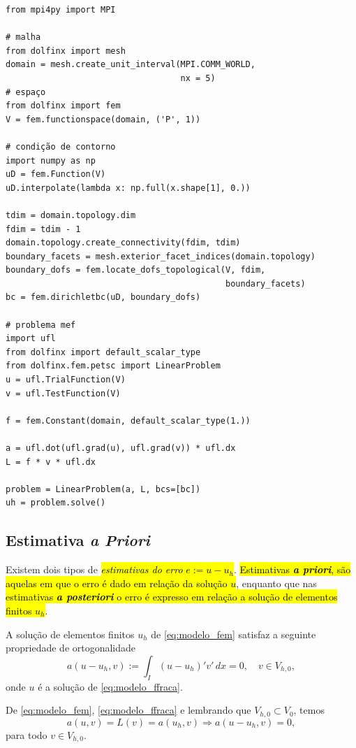 \begin{ex}
\begin{lstlisting}[caption=ex\_mef1d\_modelo.py]
from mpi4py import MPI

# malha
from dolfinx import mesh
domain = mesh.create_unit_interval(MPI.COMM_WORLD,
                                   nx = 5)
# espaço
from dolfinx import fem
V = fem.functionspace(domain, ('P', 1))

# condição de contorno
import numpy as np
uD = fem.Function(V)
uD.interpolate(lambda x: np.full(x.shape[1], 0.))

tdim = domain.topology.dim
fdim = tdim - 1
domain.topology.create_connectivity(fdim, tdim)
boundary_facets = mesh.exterior_facet_indices(domain.topology)
boundary_dofs = fem.locate_dofs_topological(V, fdim,
                                            boundary_facets)
bc = fem.dirichletbc(uD, boundary_dofs)

# problema mef
import ufl
from dolfinx import default_scalar_type
from dolfinx.fem.petsc import LinearProblem
u = ufl.TrialFunction(V)
v = ufl.TestFunction(V)

f = fem.Constant(domain, default_scalar_type(1.))

a = ufl.dot(ufl.grad(u), ufl.grad(v)) * ufl.dx
L = f * v * ufl.dx

problem = LinearProblem(a, L, bcs=[bc])
uh = problem.solve()
\end{lstlisting}
\end{ex}

\subsection{Estimativa \textit{a Priori}}
\badgeRevisar

Existem dois tipos de \hl{\emph{estimativas do erro} $e := u - u_h$}. \hl{Estimativas \textbf{\textit{a priori}}, são aquelas em que o erro é dado em relação da solução $u$}, enquanto que nas \hl{estimativas \textbf{\textit{a posteriori}} o erro é expresso em relação a solução de elementos finitos $u_h$}.

\begin{teo}\label{teo:ortogonalidade_de_Galerkin}
  A solução de elementos finitos $u_h$ de \eqref{eq:modelo_fem} satisfaz a seguinte propriedade de ortogonalidade
  \begin{equation}
    a(u-u_h,v) := \int_I (u-u_h)'v'\,dx = 0,\quad v\in V_{h,0},
  \end{equation}
onde $u$ é a solução de \eqref{eq:modelo_ffraca}.
\end{teo}
\begin{dem}
  De \eqref{eq:modelo_fem}, \eqref{eq:modelo_ffraca} e lembrando que $V_{h,0}\subset V_0$, temos
  \begin{equation}
    a(u,v) = L(v) = a(u_h,v) \Rightarrow a(u-u_h, v) = 0,
  \end{equation}
para todo $v\in V_{h,0}$.
\end{dem}

